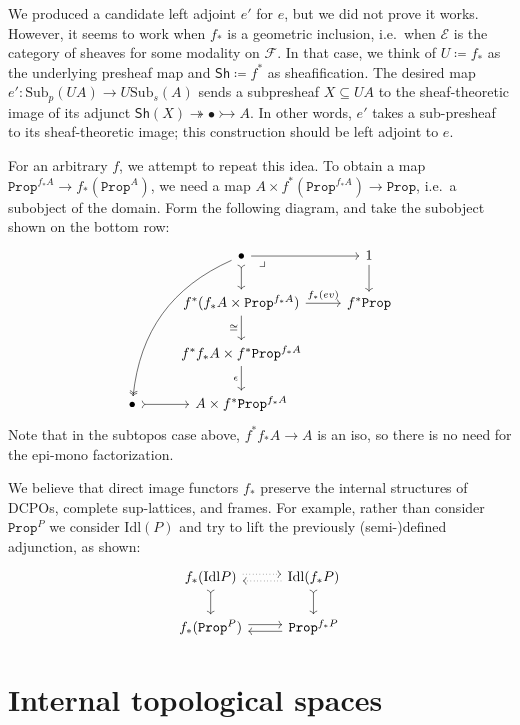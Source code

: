 \documentclass[11pt, oneside, article]{memoir}
\theoremstyle{plain}
\theoremstyle{definition}
\theoremstyle{remark}
\renewcommand{\ss}{\subseteq}
\newcommand{\const}[1]{\mathtt{#1}}
\newcommand{\Set}[1]{\mathrm{#1}}
\newcommand{\cat}[1]{\mathcal{#1}}
\newcommand{\Fun}[1]{\mathsf{#1}}
\newcommand{\surj}{\twoheadrightarrow}
\newcommand{\inj}{\rightarrowtail}
\newcommand{\Idl}{\Set{Idl}}
\newcommand{\Prop}{\const{Prop}}
\newcommand{\Sub}{\Set{Sub}}
\newcommand{\asSh}{\Fun{Sh}} %
\begin{document}
We produced a candidate left adjoint $e'$ for $e$, but we did not prove it works. However, it seems to work when $f_*$ is a geometric inclusion, i.e.\ when $\cat{E}$ is the category of sheaves for some modality on $\cat{F}$. In that case, we think of $U\coloneqq f_*$ as the underlying presheaf map and $\asSh\coloneqq f^*$ as sheafification. The desired map $e'\colon\Sub_p(UA)\to U\Sub_s(A)$ sends a subpresheaf $X\ss UA$ to the sheaf-theoretic image of its adjunct $\asSh(X)\surj\bullet\inj A$. In other words, $e'$ takes a sub-presheaf to its sheaf-theoretic image; this construction should be left adjoint to $e$.

For an arbitrary $f$, we attempt to repeat this idea. To obtain a map $\Prop^{f_*A}\to f_*(\Prop^A)$, we need a map $A\times f^*(\Prop^{f_*A})\to\Prop$, i.e.\ a subobject of the domain. Form the following diagram, and take the subobject shown on the bottom row:
\[
\begin{tikzcd}
	&\bullet\ar[r]\ar[d, tail]\ar[dr, phantom, very near start, "\lrcorner"]\ar[dddl, two heads, bend right]&1\ar[d]\\
	&f^*(f_*A\times\Prop^{f_*A})\ar[r, "f_*(ev)"]\ar[d, "\cong"']&f^*\Prop\\
	&f^*f_*A\times f^*\Prop^{f_*A}\ar[d, "\epsilon"']\\
	\bullet\ar[r, tail]&A\times f^*\Prop^{f_*A}
\end{tikzcd}
\]
Note that in the subtopos case above, $f^*f_*A\to A$ is an iso, so there is no need for the epi-mono factorization.

We believe that direct image functors $f_*$ preserve the internal structures of DCPOs, complete sup-lattices, and frames. For example, rather than consider $\Prop^P$ we consider $\Idl(P)$ and try to lift the previously (semi-)defined adjunction, as shown:
\[
\begin{tikzcd}
	f_*(\Idl P)\ar[r, shift left, dotted]\ar[d, tail]&\Idl(f_*P)\ar[l, shift left, dotted]\ar[d, tail]\\
	f_*(\Prop^P)\ar[r, shift left]&\Prop^{f_*P}\ar[l, shift left]
\end{tikzcd}
\]


\chapter{Internal topological spaces}
\end{document}

